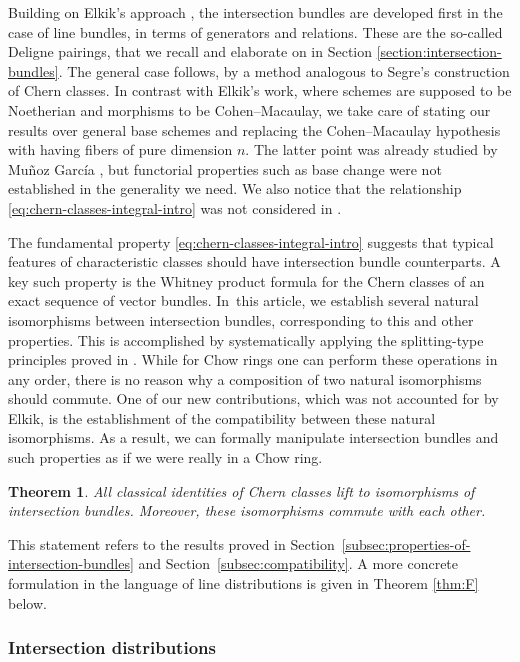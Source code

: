 \documentclass[JEP,XML,SOM,Unicode,published]{cedram}
\theoremstyle{plain}
\newtheorem{thm}{Theorem}
\theoremstyle{definition}
\begin{document}
Building on Elkik's approach \cite{Elkikfib}, the intersection bundles are developed first in the case of line bundles, in terms of generators and relations. These are the so-called Deligne pairings, that we recall and elaborate on in Section \ref{section:intersection-bundles}. The general case follows, by a method analogous to Segre's construction of Chern classes. In contrast with Elkik's work, where schemes are supposed to be Noetherian and morphisms to be Cohen--Macaulay, we take care of stating our results over general base schemes and replacing the Cohen--Macaulay hypothesis with having fibers of pure dimension $n$. The latter point was already studied by Muñoz García \cite{Munoz}, but functorial properties such as base change were not established in the generality we need. We also notice that the relationship \eqref{eq:chern-classes-integral-intro} was not considered in \cite{Elkikfib, Munoz}.

The fundamental property \eqref{eq:chern-classes-integral-intro} suggests that typical features of characteristic classes should have intersection bundle counterparts. A key such property is the Whitney product formula for the Chern classes of an exact sequence of vector bundles. In~this article, we establish several natural isomorphisms between intersection bundles, corresponding to this and other properties. This is accomplished by systematically applying the splitting-type principles proved in \cite{Eriksson-Freixas-Wentworth}. While for Chow rings one can perform these operations in any order, there is no reason why a composition of two natural isomorphisms should commute. One of our new contributions, which was not accounted for by Elkik, is the establishment of the compatibility between these natural isomorphisms. As a result, we can formally manipulate intersection bundles and such properties as if we were really in a Chow ring.

\begin{thm}\label{thm:D}
All classical identities of Chern classes lift to isomorphisms of intersection bundles. Moreover, these isomorphisms commute with each other.
\end{thm}
This statement refers to the results proved in Section~\ref{subsec:properties-of-intersection-bundles} and Section~\ref{subsec:compatibility}. A more concrete formulation in the language of line distributions is given in Theorem \ref{thm:F} below.

\subsubsection*{Intersection distributions}
\end{document}
